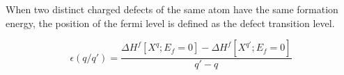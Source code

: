 When two distinct charged defects of the same atom have the same formation energy, the position of the fermi level is defined as the defect transition level. 


\begin{equation}
    \epsilon(q/q')  = \frac{\Delta H^f[X^q;E_f=0] - \Delta H^f[X^{q'};E_f=0]}{q' - q}
\end{equation}







